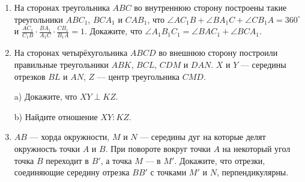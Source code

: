 \documentclass{article}
\begin{document}
\begin{enumerate}[label*=\protect\fbox{\arabic{enumi}}]
		\item На сторонах треугольника $ABC$ во внутреннюю сторону построены такие треугольники $ABC_1$, $BCA_1$ и $CAB_1$, что $\angle AC_1B+\angle BA_1C+\angle CB_1A=360^\circ$ и $\frac{AC_1}{C_1B} \cdot \frac{BA_1}{A_1C}\cdot \frac{CB_1}{B_1A}=1$. Докажите, что $\angle A_1B_1C_1=\angle BAC_1+\angle BCA_1$.
		
		\item На сторонах четырёхугольника $ABCD$ во внешнюю сторону построили правильные треугольники $ABK$, $BCL$, $CDM$ и $DAN$. $X$ и $Y$ — середины отрезков $BL$ и $AN$, $Z$ — центр треугольника $CMD$.
		
		a) Докажите, что $XY\perp KZ$.
		
		b) Найдите отношение $XY:KZ$.
		
		\item $AB$  — хорда окружности, $M$ и $N$ — середины дуг на которые делят окружность точки $A$ и $B$. При повороте вокруг точки $A$ на некоторый угол точка $B$ переходит в $B'$, а точка $M$ — в $M'$. Докажите, что отрезки, соединяющие середину отрезка $BB'$ с точками $M'$ и $N$, перпендикулярны.
		
	\end{enumerate}
\end{document}
